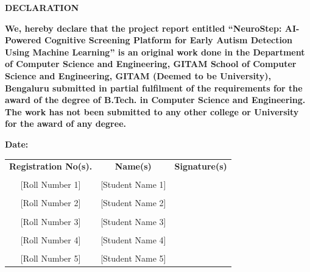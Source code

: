 \documentclass[12pt,letterpaper]{article}
\begin{document}
\vspace{1cm}

\noindent\textbf{DECLARATION}

\vspace{0.5cm}

\textbf{We, hereby declare that the project report entitled ``NeuroStep: AI-Powered Cognitive Screening Platform for Early Autism Detection Using Machine Learning'' is an original work done in the Department of Computer Science and Engineering, GITAM School of Computer Science and Engineering, GITAM (Deemed to be University), Bengaluru submitted in partial fulfilment of the requirements for the award of the degree of B.Tech. in Computer Science and Engineering. The work has not been submitted to any other college or University for the award of any degree.}

\vspace{1cm}

\textbf{Date:} \underline{\hspace{4cm}}

\vspace{2cm}

\begin{table}[h]
\centering
\begin{tabular}{ccc}
\textbf{Registration No(s).} & \textbf{Name(s)} & \textbf{Signature(s)} \\
 & & \\
{[Roll Number 1]} & [Student Name 1] & \\
 & & \\
{[Roll Number 2]} & [Student Name 2] & \\
 & & \\
{[Roll Number 3]} & [Student Name 3] & \\
 & & \\
{[Roll Number 4]} & [Student Name 4] & \\
 & & \\
{[Roll Number 5]} & [Student Name 5] & \\
\end{tabular}
\end{table}

\newpage


\thispagestyle{fancy}
\end{document}
